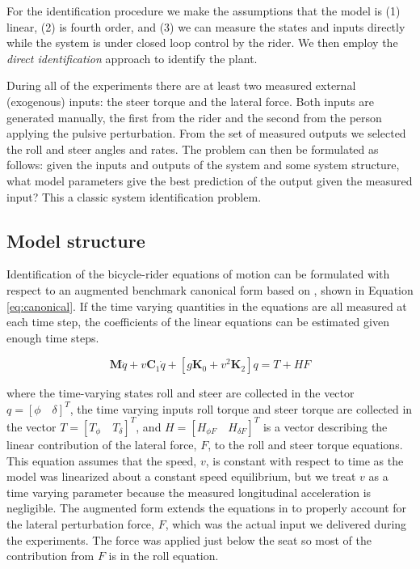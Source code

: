 \documentclass[a4paper]{article}
\begin{document}
For the identification procedure we make the assumptions that the model is (1)
linear, (2) is fourth order, and (3) we can measure the states and inputs
directly while the system is under closed loop control by the rider. We then
employ the \emph{direct identification} approach to identify the plant.

During all of the experiments there are at least two measured external
(exogenous) inputs: the steer torque and the lateral force. Both inputs are
generated manually, the first from the rider and the second from the person
applying the pulsive perturbation. From the set of measured outputs we selected
the roll and steer angles and rates. The problem can then be formulated as
follows: given the inputs and outputs of the system and some system structure,
what model parameters give the best prediction of the output given the measured
input? This a classic system identification problem.

\subsection{Model structure}

Identification of the bicycle-rider equations of motion can be formulated with
respect to an augmented benchmark canonical form based on \cite{Meijaard2007},
shown in Equation \ref{eq:canonical}. If the time varying quantities in the
equations are all measured at each time step, the coefficients of the linear
equations can be estimated given enough time steps.

\begin{equation}
  \mathbf{M} \ddot{q} + v \mathbf{C}_1 \dot{q} + [g \mathbf{K}_0 + v^2
  \mathbf{K}_2] q = T + H F
  \label{eq:canonical}
\end{equation}

where the time-varying states roll and steer are collected in the vector $q =
[\phi \quad \delta]^T$, the time varying inputs roll torque and steer torque
are collected in the vector $T = [T_\phi \quad T_\delta]^T$, and $H = [H_{\phi
F} \quad H_{\delta F}]^T$ is a vector describing the linear contribution of the
lateral force, $F$, to the roll and steer torque equations. This equation
assumes that the speed, $v$, is constant with respect to time as the model was
linearized about a constant speed equilibrium, but we treat $v$ as a time
varying parameter because the measured longitudinal acceleration is negligible.
The augmented form extends the equations in \cite{Meijaar2007} to properly
account for the lateral perturbation force, $F$, which was the actual input we
delivered during the experiments. The force was applied just below the seat so
most of the contribution from $F$ is in the roll equation.
\end{document}
